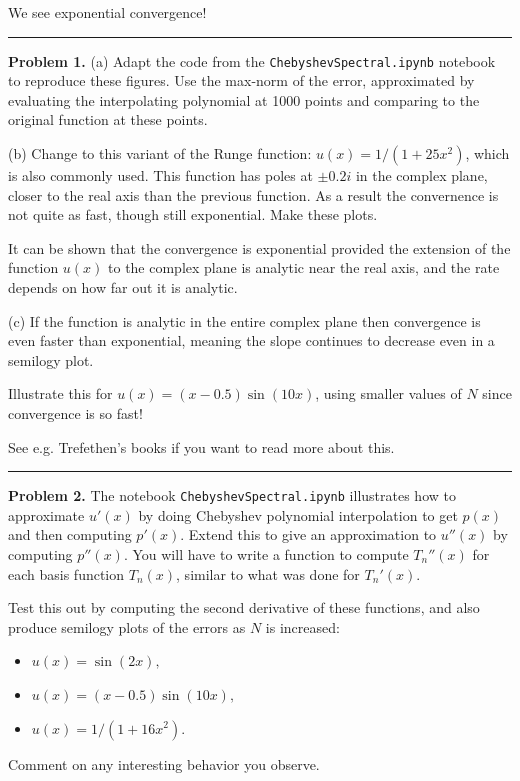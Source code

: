 \documentclass[10pt]{article}
\begin{document}
We see exponential convergence!



\vskip 1cm
\hrule
{\bf Problem 1.}
(a) Adapt the code from the {\tt ChebyshevSpectral.ipynb} notebook to reproduce
these figures.  Use the max-norm of the error, approximated by 
evaluating the interpolating polynomial at 1000 points and comparing to the
original function at these points.

(b) Change to this variant of the Runge function: $u(x) = 1/(1 + 25x^2)$,
which is also commonly used.  This function has poles at $\pm 0.2i$ in the
complex plane, closer to the real axis than the previous function.  As a
result the convernence is not quite as fast, though still exponential.
Make these plots.

It can be shown that the convergence is exponential provided the
extension of the function $u(x)$ to the complex plane is analytic near the
real axis, and the rate depends on how far out it is analytic.

(c) If the function is analytic in the entire complex plane then convergence is
even faster than exponential, meaning the slope continues to decrease even
in a semilogy plot.  

Illustrate this for $u(x) = (x-0.5)\sin(10x)$, 
using smaller values of $N$ since convergence is so fast!

See e.g. Trefethen's books if you want to read more about this.



\vskip 1cm
\hrule
{\bf Problem 2.}
The notebook {\tt ChebyshevSpectral.ipynb} illustrates how to approximate
$u'(x)$ by doing Chebyshev polynomial interpolation to get $p(x)$ and then
computing $p'(x)$.  Extend this to give an approximation to $u''(x)$ by
computing $p''(x)$.  You will have to write a function to compute $T_n''(x)$
for each basis function $T_n(x)$, similar to what was done for $T_n'(x)$.

Test this out by computing the second derivative of these functions, and
also produce semilogy plots of the errors as $N$ is increased:

\begin{itemize}
\item $u(x) = \sin(2x),$
\item $u(x) = (x-0.5)\sin(10x),$
\item $u(x) = 1/(1 + 16x^2).$
\end{itemize}
Comment on any interesting behavior you observe.
\end{document}
